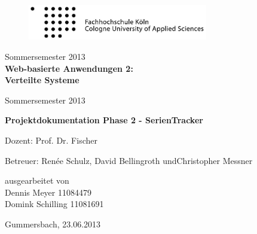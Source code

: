 \begin{titlepage}

\begin{center}

\begin{figure}[h!]
		\includegraphics[width=0.7\textwidth]{images/logo.jpg}
\end{figure}

\vspace{3cm}

\LARGE {Sommersemester 2013\\}
\textbf{\huge Web-basierte Anwendungen 2: \\Verteilte Systeme\\}

\vspace{0.5cm}

\LARGE {Sommersemester 2013}


\vspace{1.5cm}

\textbf{\LARGE Projektdokumentation Phase 2 - SerienTracker}
\vspace{2cm}

\end{center}


Dozent: Prof. Dr. Fischer\\
\vspace{0.2cm}

Betreuer: Renée Schulz, David Bellingroth undChristopher Messner


\vspace{1cm}

ausgearbeitet von\\
\hspace{2cm} Dennis Meyer 11084479\\
\hspace{2cm} Domink Schilling 11081691

\vspace{2cm}
Gummersbach, 23.06.2013

\end{titlepage}